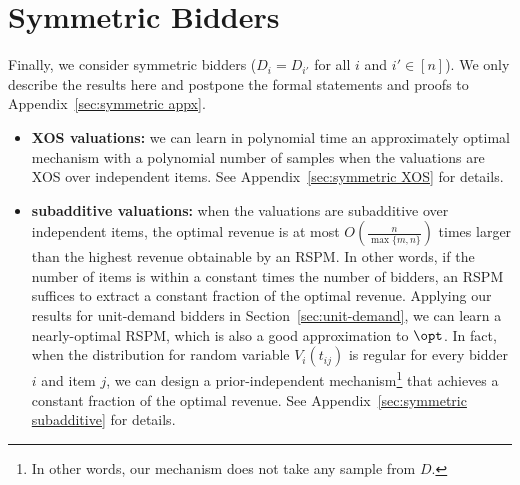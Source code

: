 \section{Symmetric Bidders}\label{sec:symmetric bidders}
Finally, we consider symmetric bidders ($D_i=D_{i'}$ for all $i$ and $i'\in[n]$). We only describe the results here and postpone the formal statements and proofs to Appendix~\ref{sec:symmetric appx}.
 \begin{itemize}
 	\item  \textbf{XOS valuations:} we can learn in polynomial time an approximately optimal mechanism with a polynomial number of samples when the valuations are XOS over independent items. See Appendix~\ref{sec:symmetric XOS} for details.
 	\item \textbf{subadditive valuations:} when the valuations are subadditive over independent items,  the optimal revenue is at most $O\left(\frac{n}{\max\{m,n\}}\right)$ times larger than the highest revenue obtainable by an RSPM. In other words, if the number of items is within a constant times the number of bidders, an RSPM suffices to extract a constant fraction of the optimal revenue.  Applying our results for unit-demand bidders in Section~\ref{sec:unit-demand}, we can learn a nearly-optimal RSPM, which is also a good approximation to $\opt$. In fact, when the distribution for random variable $V_i(t_{ij})$ is regular for every bidder $i$ and item $j$, we can design a prior-independent mechanism\footnote{In other words, our mechanism does not take any sample from $D$.} that achieves a constant fraction of the optimal revenue. See Appendix~\ref{sec:symmetric subadditive} for details.
 \end{itemize}

